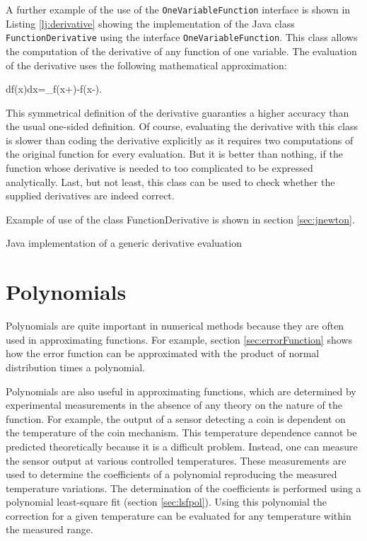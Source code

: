 \documentclass[twoside]{book}
\begin{document}
A further example of the use of the {\tt OneVariableFunction}
interface is shown in Listing \ref{lj:derivative} showing the
implementation of the Java class {\tt FunctionDerivative} using
the interface {\tt OneVariableFunction}. This class allows the
computation of the derivative of any function of one variable. The
evaluation of the derivative uses the following mathematical
approximation:

\begin{mainEquation}
\label{eq:derivative} {df\left(x\right)\over dx}=\lim_{\epsilon{}}{f\left(x+\epsilon\right)-f\left(x-\epsilon\right)\epsilon}.
\end{mainEquation}
This symmetrical definition of the derivative guaranties a higher
accuracy than the usual one-sided definition. Of course,
evaluating the derivative with this class is slower than coding
the derivative explicitly as it requires two computations of the
original function for every evaluation. But it is better than
nothing, if the function whose derivative is needed to too
complicated to be expressed analytically. Last, but not least,
this class can be used to check whether the supplied derivatives
are indeed correct.

Example of use of the class FunctionDerivative is shown in section
\ref{sec:jnewton}.
\begin{listing}
Java implementation of a generic derivative evaluation
\label{lj:derivative}

\end{listing}


\section{Polynomials}
\label{sec:polynomial}
 Polynomials are quite important in
numerical methods because they are often used in approximating
functions. For example, section \ref{sec:errorFunction} shows how
the error function can be approximated with the product of normal
distribution times a polynomial.

Polynomials are also useful in approximating functions, which are
determined by experimental measurements in the absence of any
theory on the nature of the function. For example, the output of a
sensor detecting a coin is dependent on the temperature of the
coin mechanism. This temperature dependence cannot be predicted
theoretically because it is a difficult problem. Instead, one can
measure the sensor output at various controlled temperatures.
These measurements are used to determine the coefficients of a
polynomial reproducing the measured temperature variations. The
determination of the coefficients is performed using a polynomial
least-square fit (\cf section \ref{sec:lsfpol}). Using this
polynomial the correction for a given temperature can be evaluated
for any temperature within the measured range.
\end{document}
